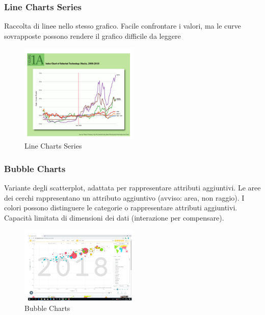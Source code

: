 \subsubsection{Line Charts Series}
Raccolta di linee nello stesso grafico. 
Facile confrontare i valori, ma le curve sovrapposte possono rendere il grafico difficile da leggere
\begin{figure}[H]
    \centering
    \includegraphics[width=0.5\textwidth]{images/LineSeries.png} %
    \caption{Line Charts Series}
    \label{fig:immagine}
\end{figure}
\subsubsection{Bubble Charts}
Variante degli scatterplot, adattata per rappresentare attributi aggiuntivi. Le aree dei cerchi 
rappresentano un attributo aggiuntivo (avviso: area, non raggio). 
I colori possono distinguere le categorie o rappresentare attributi aggiuntivi. Capacità limitata di dimensioni dei dati (interazione per compensare).
\begin{figure}[H]
    \centering
    \includegraphics[width=0.5\textwidth]{images/Bubble.png} %
    \caption{Bubble Charts}
    \label{fig:immagine}
\end{figure}
